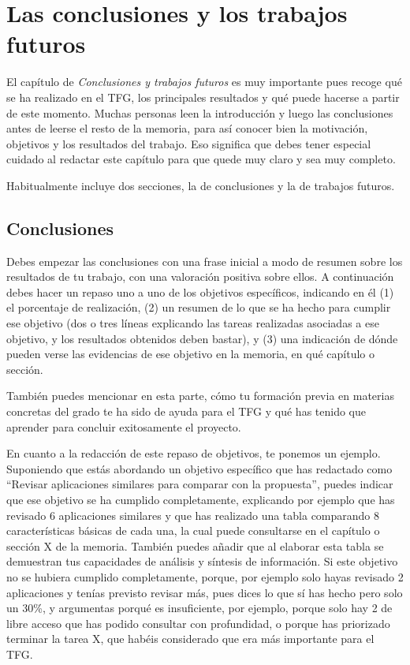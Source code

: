 \chapter{Las conclusiones y los trabajos futuros}
\label{cap:Conclusiones}

El capítulo de \textit{Conclusiones y trabajos futuros} es muy importante pues recoge qué se ha realizado en el TFG, los principales resultados y qué puede hacerse a partir de este momento. Muchas personas leen la introducción y luego las conclusiones antes de leerse el resto de la memoria, para así conocer bien la motivación, objetivos y los resultados del trabajo. Eso significa que debes tener especial cuidado al redactar este capítulo para que quede muy claro y sea muy completo.

Habitualmente incluye dos secciones, la de conclusiones y la de trabajos futuros.
 
 \section{Conclusiones}
Debes empezar las conclusiones con una frase inicial a modo de resumen sobre los resultados de tu trabajo, con una valoración positiva sobre ellos.  A continuación debes hacer un repaso uno a uno de los objetivos específicos, indicando en él (1) el porcentaje de realización, (2) un resumen de lo que se ha hecho para cumplir ese objetivo (dos o tres líneas explicando las tareas realizadas asociadas a ese objetivo, y los resultados obtenidos deben bastar), y (3) una indicación de dónde pueden verse las evidencias de ese objetivo en la memoria, en qué capítulo o sección.

También puedes mencionar en esta parte, cómo tu formación previa en materias concretas del grado te ha sido de ayuda para el TFG y qué has tenido que aprender para concluir exitosamente el proyecto.

 En cuanto a la redacción de este repaso de objetivos, te ponemos un ejemplo. Suponiendo que estás abordando un objetivo específico que has redactado como ``Revisar aplicaciones similares para comparar con la propuesta'', puedes indicar que ese objetivo se ha cumplido completamente, explicando por ejemplo que has revisado 6 aplicaciones similares y que has realizado una tabla comparando 8 características básicas de cada una, la cual puede consultarse en el capítulo o sección X de la memoria. También puedes añadir que al elaborar esta tabla se demuestran tus capacidades de análisis y síntesis de información. Si este objetivo no se hubiera cumplido completamente, porque, por ejemplo solo hayas revisado 2 aplicaciones y tenías previsto revisar más, pues dices lo que sí has hecho pero solo un 30\%, y argumentas porqué es insuficiente, por ejemplo, porque solo hay 2 de libre acceso que has podido consultar con profundidad, o porque has priorizado terminar la tarea X, que habéis considerado que era más importante para el TFG. 

